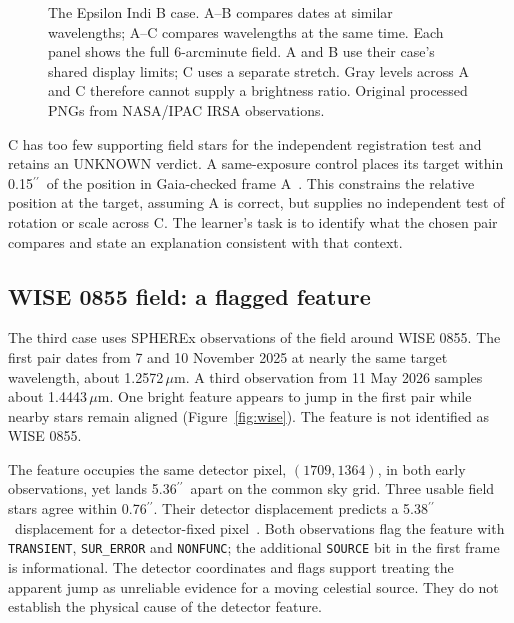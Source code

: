 \documentclass[11pt,letterpaper]{article}
\newcommand{\micron}{\ensuremath{\mu\mathrm{m}}}
\newcommand{\arcsec}{\ensuremath{^{\prime\prime}}}
\begin{document}
\begin{figure}[htbp]
 \centering
 
 \caption{The Epsilon Indi B case. A--B compares dates at similar wavelengths; A--C compares wavelengths at the same time. Each panel shows the full 6-arcminute field. A and B use their case's shared display limits; C uses a separate stretch. Gray levels across A and C therefore cannot supply a brightness ratio. Original processed PNGs from NASA/IPAC IRSA observations.}
 \label{fig:epsilon}
\end{figure}

C has too few supporting field stars for the independent registration test and retains an UNKNOWN verdict. A same-exposure control places its target within 0.15\arcsec\ of the position in Gaia-checked frame A~\cite{registration}. This constrains the relative position at the target, assuming A is correct, but supplies no independent test of rotation or scale across C. The learner's task is to identify what the chosen pair compares and state an explanation consistent with that context.

\subsection{WISE 0855 field: a flagged feature}
The third case uses SPHEREx observations of the field around WISE 0855. The first pair dates from 7 and 10 November 2025 at nearly the same target wavelength, about 1.2572\,\micron. A third observation from 11 May 2026 samples about 1.4443\,\micron. One bright feature appears to jump in the first pair while nearby stars remain aligned (Figure~\ref{fig:wise}). The feature is not identified as WISE 0855.

The feature occupies the same detector pixel, $(1709,1364)$, in both early observations, yet lands 5.36\arcsec\ apart on the common sky grid. Three usable field stars agree within 0.76\arcsec. Their detector displacement predicts a 5.38\arcsec\ displacement for a detector-fixed pixel~\cite{controls}. Both observations flag the feature with \texttt{TRANSIENT}, \texttt{SUR\_ERROR} and \texttt{NONFUNC}; the additional \texttt{SOURCE} bit in the first frame is informational. The detector coordinates and flags support treating the apparent jump as unreliable evidence for a moving celestial source. They do not establish the physical cause of the detector feature.
\end{document}
